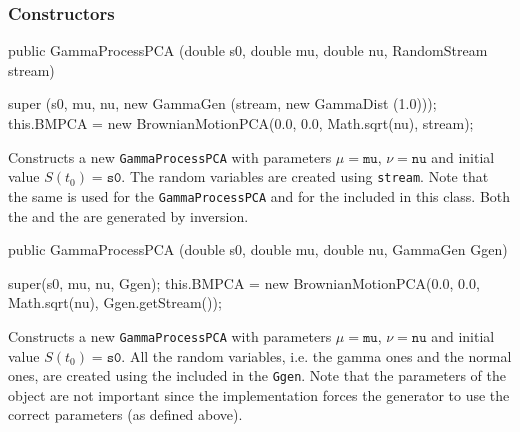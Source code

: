 \subsubsection* {Constructors}
\begin{code}

   public GammaProcessPCA (double s0, double mu, double nu,
                           RandomStream stream)\begin{hide} {
        super (s0, mu, nu,  new GammaGen (stream, new GammaDist (1.0)));
        this.BMPCA = new BrownianMotionPCA(0.0, 0.0, Math.sqrt(nu), stream);
    }\end{hide}
\end{code}
\begin{tabb} Constructs a new \texttt{GammaProcessPCA} with parameters
$\mu = \texttt{mu}$, $\nu = \texttt{nu}$ and initial value $S(t_{0}) = \texttt{s0}$.
The random variables are created using  \texttt{stream}.
Note that the same 
 is used for the \texttt{GammaProcessPCA} and for the
 included in this class.  Both the
 and the  are generated by
inversion.
\end{tabb}
\begin{code}

   public GammaProcessPCA (double s0, double mu, double nu, GammaGen Ggen)\begin{hide} {
        super(s0, mu, nu, Ggen);
        this.BMPCA = new BrownianMotionPCA(0.0, 0.0, Math.sqrt(nu), Ggen.getStream());
    }\end{hide}
\end{code}
\begin{tabb} Constructs a new \texttt{GammaProcessPCA} with parameters
$\mu = \texttt{mu}$, $\nu = \texttt{nu}$ and initial value $S(t_{0}) = \texttt{s0}$.
All the random variables, i.e. the gamma ones and the normal ones,
are created using the 
included in the 
\texttt{Ggen}. Note that the parameters of the
 object
are not important since the implementation forces the generator
to use the correct parameters (as defined above).
\end{tabb}
